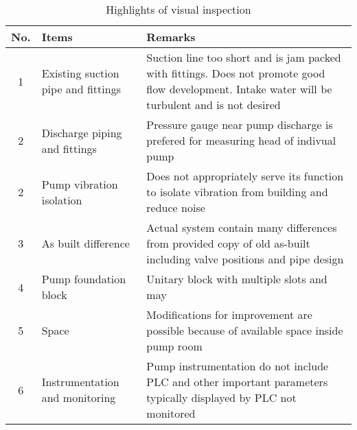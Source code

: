\begin{table}[!htb]
	\caption{Highlights of visual inspection}
	\label{ch043_tbl_visualinspectionHL}
	{\scriptsize

\begin{tabular}{c|p{3cm}|p{9.5cm}}

\hline
No. & Items & Remarks \\ 
\hline
1 & Existing suction pipe and fittings & Suction line too short and is jam packed with fittings. Does not promote good flow development. Intake water will be turbulent and is not desired \\ 
2 & Discharge piping and fittings & Pressure gauge near pump discharge is prefered for measuring head of indivual pump \\ 
2 & Pump vibration isolation  & Does not appropriately serve its function to isolate vibration from building and reduce noise \\ 
3 & As built difference & Actual system contain many differences from provided copy of old as-built including valve positions and pipe design \\ 
4 & Pump foundation block & Unitary block with multiple slots and may  \\ 
5 & Space & Modifications for improvement are possible because of available space inside pump room \\ 
6 & Instrumentation and monitoring & Pump instrumentation do not include PLC and other important parameters typically displayed by PLC not monitored \\ 
\hline

\end{tabular}

	}%
\end{table}